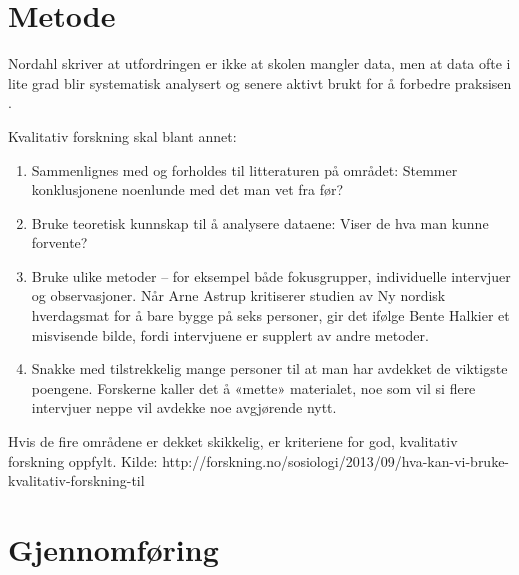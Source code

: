 \documentclass[main.tex]{subfiles}
\begin{document}
\section*{Metode}
\label{sec:2}


Nordahl skriver at utfordringen er ikke at skolen mangler data, men at data ofte i lite grad blir
systematisk analysert og senere aktivt brukt for å forbedre praksisen .

Kvalitativ forskning skal blant annet:
\begin{enumerate}
\item Sammenlignes med og forholdes til litteraturen på området: Stemmer konklusjonene noenlunde med det man vet fra før?
\item Bruke teoretisk kunnskap til å analysere dataene: Viser de hva man kunne forvente?
\item Bruke ulike metoder – for eksempel både fokusgrupper, individuelle intervjuer og observasjoner. Når Arne Astrup kritiserer studien av Ny nordisk hverdagsmat for å bare bygge på seks personer, gir det ifølge Bente Halkier et misvisende bilde, fordi intervjuene er supplert av andre metoder.
\item Snakke med tilstrekkelig mange personer til at man har avdekket de viktigste poengene. Forskerne kaller det å «mette» materialet, noe som vil si flere intervjuer neppe vil avdekke noe avgjørende nytt.
\end{enumerate}
Hvis de fire områdene er dekket skikkelig, er kriteriene for god, kvalitativ forskning oppfylt.
\newline
\newline
Kilde: http://forskning.no/sosiologi/2013/09/hva-kan-vi-bruke-kvalitativ-forskning-til

\section*{Gjennomføring}
\label{sec:3}
\end{document}

